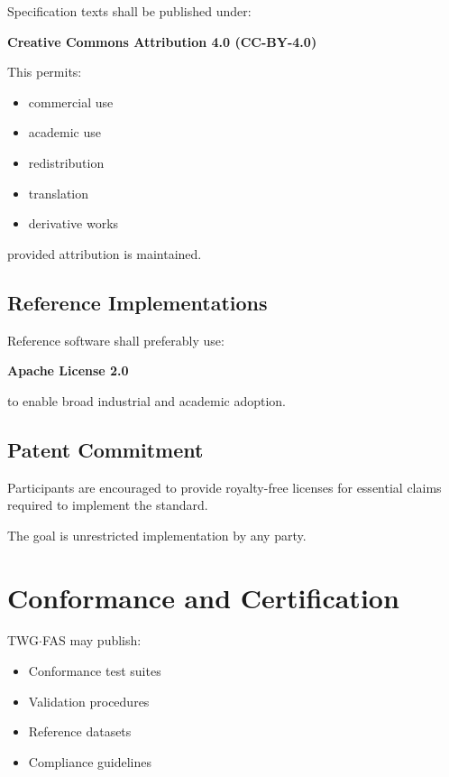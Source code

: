 \documentclass[11pt,a4paper]{article}
\begin{document}
Specification texts shall be published under:

\begin{center}
\textbf{Creative Commons Attribution 4.0 (CC-BY-4.0)}
\end{center}

This permits:

\begin{itemize}
\item commercial use
\item academic use
\item redistribution
\item translation
\item derivative works
\end{itemize}

provided attribution is maintained.

\subsection{Reference Implementations}

Reference software shall preferably use:

\begin{center}
\textbf{Apache License 2.0}
\end{center}

to enable broad industrial and academic adoption.

\subsection{Patent Commitment}

Participants are encouraged to provide royalty-free licenses for
essential claims required to implement the standard.

The goal is unrestricted implementation by any party.

\section{Conformance and Certification}

TWG$\cdot$FAS may publish:

\begin{itemize}
\item Conformance test suites
\item Validation procedures
\item Reference datasets
\item Compliance guidelines
\end{itemize}
\end{document}
